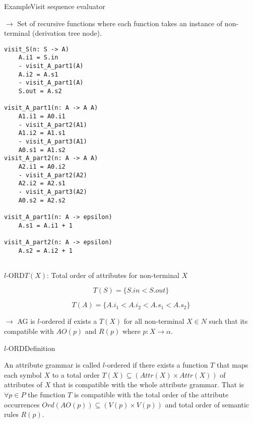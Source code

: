 \begin{frame}[fragile=singleslide]{Example}{Visit sequence evaluator}

$\to$ Set of \alert{recursive functions} where each function takes an \alert{instance of non-terminal} (derivation tree node).

\begin{multicols}{2}
\begin{Verbatim}[fontsize=\scriptsize]
visit_S(n: S -> A)
    A.i1 = S.in
    - visit_A_part1(A)
    A.i2 = A.s1
    - visit_A_part1(A)
    S.out = A.s2

visit_A_part1(n: A -> A A)
    A1.i1 = A0.i1
    - visit_A_part2(A1)
    A1.i2 = A1.s1
    - visit_A_part3(A1)
    A0.s1 = A1.s2
visit_A_part2(n: A -> A A)
    A2.i1 = A0.i2
    - visit_A_part2(A2)
    A2.i2 = A2.s1
    - visit_A_part3(A2)
    A0.s2 = A2.s2

visit_A_part1(n: A -> epsilon)
    A.s1 = A.i1 + 1

visit_A_part2(n: A -> epsilon)
    A.s2 = A.i2 + 1
    
\end{Verbatim}
\end{multicols}
\end{frame}


\begin{frame}{$l$-ORD}{$T(X)$: Total order of attributes for non-terminal $X$ }

\[  T(S) = \{ S.\mathit{in} < S.\mathit{out}  \}  \]

\[  T(A) = \{ A.i_1 < A.i_2 < A.s_1 < A.s_2 \}  \]

\newlinevspace

$\to$ AG is $l$-ordered if exists a $T(X)$  for all non-terminal $X \in N$ such that its \alert{compatible} with $\mathit{AO}(p)$ and $R(p)$ where $p: X \rightarrow \alpha$. 

\end{frame}

\begin{frame}{$l$-ORD}{Definition}

\begin{definition}
An attribute grammar is called $l$-ordered if there exists a function $T$ that maps each symbol $X$ to a total order $T(X) \subseteq (\mathit{Attr}(X) \times \mathit{Attr}(X))$ of attributes of $X$ that is \alert{compatible} with the whole attribute grammar. That is $\forall p \in P$ the function $T$ is \alert{compatible} with the total order of the attribute occurrences $\mathit{Ord}(\mathit{AO}(p)) \subseteq (V(p) \times V(p))$ and total order of semantic rules $R(p)$.

\end{definition}
\end{frame}

